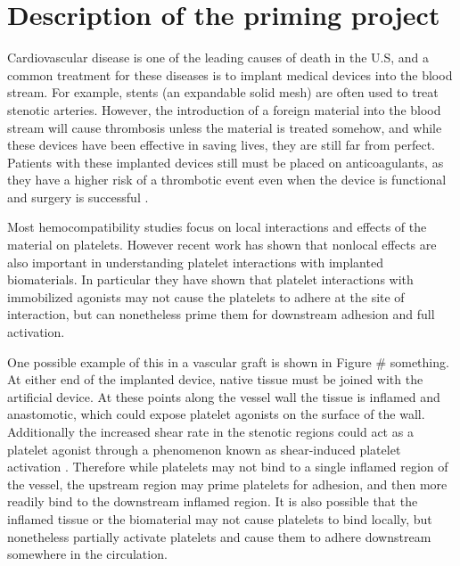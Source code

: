 


\section{Description of the priming project}
\label{sec:priming-project}

Cardiovascular disease is one of the leading causes of death in the
U.S, and a common treatment for these diseases is to implant medical
devices into the blood stream. For example, stents (an expandable
solid mesh) are often used to treat stenotic arteries. However, the
introduction of a foreign material into the blood stream will cause
thrombosis unless the material is treated somehow, and while these
devices have been effective in saving lives, they are still far from
perfect. Patients with these implanted devices still must be placed on
anticoagulants, as they have a higher risk of a thrombotic event even
when the device is functional and surgery is successful
\cite{Cannegieter1994}.
		

Most hemocompatibility studies focus on local interactions and effects
of the material on platelets. However recent work
\cite{Corum2011,Corum2012} has shown that nonlocal effects are also
important in understanding platelet interactions with implanted
biomaterials. In particular they have shown that platelet interactions
with immobilized agonists may not cause the platelets to adhere at the
site of interaction, but can nonetheless prime them for downstream
adhesion and full activation.

One possible example of this in a vascular graft is shown in Figure \#
something. At either end of the implanted device, native tissue must
be joined with the artificial device. At these points along the vessel
wall the tissue is inflamed and anastomotic, which could expose
platelet agonists on the surface of the wall. Additionally the
increased shear rate in the stenotic regions could act as a platelet
agonist through a phenomenon known as shear-induced platelet
activation \cite{Fogelson2015,Kroll96,Shankaran2003}. Therefore while
platelets may not bind to a single inflamed region of the vessel, the
upstream region may prime platelets for adhesion, and then more
readily bind to the downstream inflamed region. It is also possible
that the inflamed tissue or the biomaterial may not cause platelets to
bind locally, but nonetheless partially activate platelets and cause
them to adhere downstream somewhere in the circulation.
		
